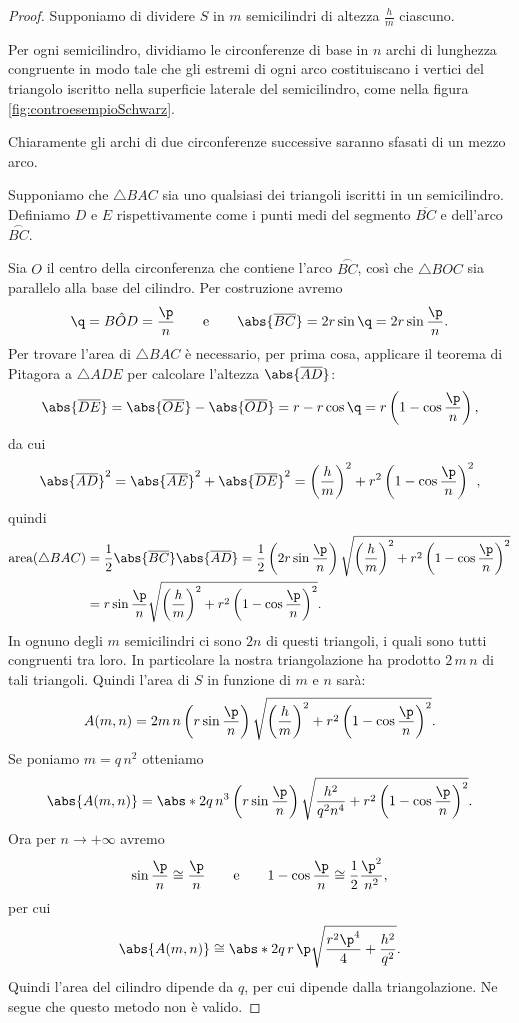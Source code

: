 \begin{proof}
	Supponiamo di dividere \(S\) in \(m\) semicilindri di altezza \(\frac{h}{m}\) ciascuno.

	Per ogni semicilindro, dividiamo le circonferenze di base in \(n\) archi di lunghezza congruente in modo tale che gli estremi di ogni arco costituiscano i vertici del triangolo iscritto nella superficie laterale del semicilindro, come nella figura \ref{fig:controesempioSchwarz}.

	Chiaramente gli archi di due circonferenze successive saranno sfasati di un mezzo arco.

	Supponiamo che \(\triangle BAC\) sia uno qualsiasi dei triangoli iscritti in un semicilindro.
	Definiamo \(D\) e \(E\) rispettivamente come i punti medi del segmento \(\overline{BC}\) e dell'arco \(\overset{\frown}{BC}\).

	Sia \(O\) il centro della circonferenza che contiene l'arco \(\overset{\frown}{BC}\), così che \(\triangle BOC\) sia parallelo alla base del cilindro.
	Per costruzione avremo
	\[
		\q = B\hat{O}D = \frac{\p}{n} \qquad\text{e}\qquad \abs{\overline{BC}} = 2r \sin \q = 2r \sin \frac{\p}{n}.
	\]
	Per trovare l'area di \(\triangle BAC\) è necessario, per prima cosa, applicare il teorema di Pitagora a \(\triangle ADE\) per calcolare l'altezza \(\abs{\overline{AD}}\):
	\[
		\abs{\overline{DE}} = \abs{\overline{OE}} - \abs{\overline{OD}} = r-r \cos \q = r \left( 1-\cos \frac{\p}{n} \right),
	\]
	da cui
	\[
		\abs{\overline{AD}}^2 = \abs{\overline{AE}}^2 + \abs{\overline{DE}}^2 = \left( \frac{h}{m} \right)^2 + r^2 \left( 1-\cos \frac{\p}{n} \right)^2,
	\]
	quindi
	\[
		\begin{split}
			\text{area}(\triangle BAC) & = \frac{1}{2} \abs{\overline{BC}} \abs{\overline{AD}} = \frac{1}{2} \left( 2r \sin \frac{\p}{n} \right) \sqrt{\left( \frac{h}{m} \right)^2 + r^2 \left( 1- \cos \frac{\p}{n} \right)^2}\\
			& = r\sin \frac{\p}{n} \sqrt{\left( \frac{h}{m} \right)^2 + r^2 \left( 1- \cos \frac{\p}{n} \right)^2}.
		\end{split}
	\]
	In ognuno degli \(m\) semicilindri ci sono \(2n\) di questi triangoli, i quali sono tutti congruenti tra loro.
	In particolare la nostra triangolazione ha prodotto \(2\,m\,n\) di tali triangoli.
	Quindi l'area di \(S\) in funzione di \(m\) e \(n\) sarà:
	\[
		A(m,n) = 2m\,n \left(r\sin \frac{\p}{n}\right) \sqrt{\left( \frac{h}{m} \right)^2 + r^2 \left( 1- \cos \frac{\p}{n} \right)^2}.
	\]
	Se poniamo \(m=q\,n^2\) otteniamo
	\[
		\abs{A(m,n)} = \abs*{2q\,n^3 \left( r \sin \frac{\p}{n} \right) \sqrt{\frac{h^2}{q^2 n^4} + r^2 \left( 1-\cos \frac{\p}{n} \right)^2}}.
	\]
	Ora per \(n \to +\infty\) avremo
	\[
		\sin \frac{\p}{n} \cong \frac{\p}{n} \qquad\text{e}\qquad 1-\cos \frac{\p}{n} \cong \frac{1}{2} \frac{\p^2}{n^2},
	\]
	per cui
	\[
		\abs{A(m,n)} \cong \abs*{2q\,r\,\p \sqrt{ \frac{r^2 \p^4}{4}+ \frac{h^2}{q^2}}}.
	\]
	Quindi l'area del cilindro dipende da \(q\), per cui dipende dalla triangolazione.
	Ne segue che questo metodo non è valido.
\end{proof}


